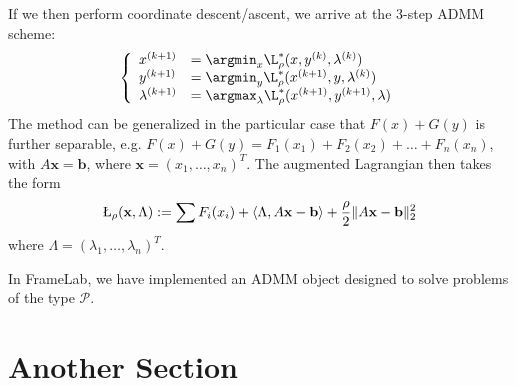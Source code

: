 \documentclass[12pt]{article}
\begin{document}
 If we then perform coordinate descent/ascent, we arrive at the 3-step ADMM scheme: 
\begin{align*}
\left\{\begin{array}{ll}
x^{(k+1)} &= \argmin_x \L_\rho^*(x,y^{(k)},\lambda^{(k)}) \\
y^{(k+1)} &= \argmin_y \L_\rho^*(x^{(k+1)},y,\lambda^{(k)})\\
\lambda^{(k+1)} &= \argmax_\lambda \L_{\rho}^*(x^{(k+1)},y^{(k+1)},\lambda)
\end{array}\right. 
\end{align*} The method can be generalized in the particular case that $F(x)+G(y)$ is further separable, e.g. $F(x)+G(y) = F_1(x_1)+F_2(x_2)+\ldots+F_n(x_n)$, with $A\textbf{x}=\textbf{b}$, where $\textbf{x} = (x_1,\ldots,x_n)^T$.  The augmented Lagrangian then takes the form 
\begin{align*}
\L_\rho (\textbf{x},\Lambda) : = \sum F_i(x_i) + \left\langle \Lambda,A\textbf{x}-\textbf{b}\right\rangle +\frac{\rho}{2}\|A\textbf{x}-\textbf{b}\|_2^2 
\end{align*} where $\Lambda = (\lambda_1,\ldots,\lambda_n)^T$. 

In FrameLab, we have implemented an ADMM object designed to solve problems of the type $\mathcal{P}$.
\section{Another Section}




\end{document}
